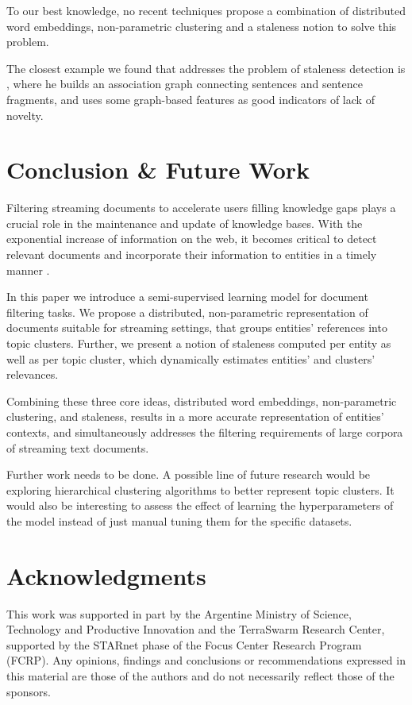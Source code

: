\documentclass{article}
\begin{document}
To our best knowledge, no recent techniques propose a combination of distributed word embeddings, non-parametric clustering and a staleness notion to solve this problem. 

The closest example we found that addresses the problem of staleness detection is \cite{gamon}, where he builds an association graph connecting sentences and sentence fragments, and uses some graph-based features as good indicators of lack of novelty.

\section{Conclusion \& Future Work}
\label{conclusion}

Filtering streaming documents to accelerate users filling knowledge gaps plays a crucial role in the maintenance and update of knowledge bases.
With the exponential increase of information on the web, it becomes critical to detect relevant documents and incorporate their information to entities in a timely manner \cite{jingang13}.

In this paper we introduce a semi-supervised learning model for document filtering tasks. We propose a distributed, non-parametric representation of documents suitable for streaming settings, that groups entities' references into topic clusters. Further, we present a notion of staleness computed per entity as well as per topic cluster, which dynamically estimates entities' and clusters' relevances.

Combining these three core ideas, distributed word embeddings, non-parametric clustering, and staleness, results in a more accurate representation of entities' contexts, and simultaneously addresses the filtering requirements of large corpora of streaming text documents.

Further work needs to be done. A possible line of future research would be exploring hierarchical clustering algorithms to better represent topic clusters. It would also be interesting to assess the effect of learning the hyperparameters of the model instead of just manual tuning them for the specific datasets.

\section*{Acknowledgments} 
 
This work was supported in part by the Argentine Ministry of Science, Technology and Productive Innovation and the TerraSwarm Research Center, supported by the STARnet phase of the Focus Center Research Program (FCRP). Any opinions, findings and conclusions or recommendations expressed in this material are those of the authors and do not necessarily reflect those of the sponsors.



\end{document}
